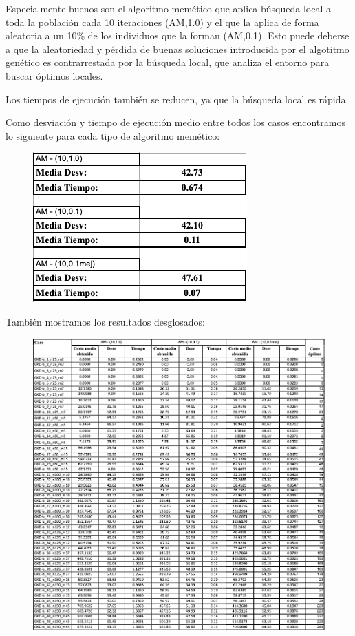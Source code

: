 Especialmente buenos son el algoritmo memético que aplica búsqueda local a toda la población cada 10 iteraciones (AM,1.0) y el que la aplica de forma aleatoria a un 10\% de los individuos que la forman (AM,0.1). Esto puede deberse a que la aleatoriedad y pérdida de buenas soluciones introducida por el algotitmo genético es contrarrestada por la búsqueda local, que analiza el entorno para buscar óptimos locales.

Los tiempos de ejecución también se reducen, ya que la búsqueda local es rápida.

Como desviación y tiempo de ejecución medio entre todos los casos encontramos lo siguiente para cada tipo de algoritmo memético:
\begin{figure}[H] %
    \centering
        \includegraphics[scale=0.8]{img/mem.png}
\end{figure}

También mostramos los resultados desglosados:
\begin{figure}[H] %
    \centering
        \includegraphics[scale=0.5]{img/am.png}
\end{figure}


